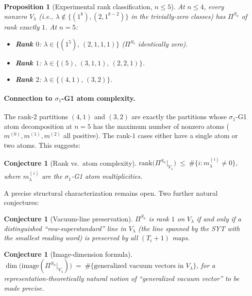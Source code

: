 \documentclass[11pt]{article}
\newtheorem{proposition}[theorem]{Proposition}
\newtheorem{conjecture}[theorem]{Conjecture}
\theoremstyle{definition}
\begin{document}
\begin{proposition}[Experimental rank classification, $n \leq 5$]\label{prop:rank-class}
At $n \leq 4$, every nonzero $V_\lambda$ (i.e., $\lambda \notin \{(1^k), (2,1^{k-2})\}$ in the trivially-zero classes) has $\Pi^{S_n}$ of rank exactly $1$. At $n = 5$:
\begin{itemize}[leftmargin=2em,topsep=0.3em,itemsep=0.2em]
\item \textbf{Rank $0$}: $\lambda \in \{(1^5),\, (2,1,1,1)\}$ ($\Pi^{S_5}$ identically zero).
\item \textbf{Rank $1$}: $\lambda \in \{(5),\, (3,1,1),\, (2,2,1)\}$.
\item \textbf{Rank $2$}: $\lambda \in \{(4,1),\, (3,2)\}$.
\end{itemize}
\end{proposition}

\paragraph{Connection to $\sigma_1$-G1 atom complexity.} The rank-$2$ partitions $(4,1)$ and $(3,2)$ are exactly the partitions whose $\sigma_1$-G1 atom decomposition at $n=5$ has the maximum number of nonzero atoms ($m^{(0)}, m^{(1)}, m^{(2)}$ all positive). The rank-$1$ cases either have a single atom or two atoms. This suggests:

\begin{conjecture}[Rank vs.\ atom complexity]\label{conj:rank-atom}
$\mathrm{rank}\bigl(\Pi^{S_n}\big|_{V_\lambda}\bigr) \;\leq\; \#\{i : m_\lambda^{(i)} \neq 0\}$,
where $m_\lambda^{(i)}$ are the $\sigma_1$-G1 atom multiplicities.
\end{conjecture}

A precise structural characterization remains open. Two further natural conjectures:

\begin{conjecture}[Vacuum-line preservation]\label{conj:vacuum}
$\Pi^{S_n}$ is rank $1$ on $V_\lambda$ if and only if a distinguished ``row-superstandard'' line in $V_\lambda$ (the line spanned by the SYT with the smallest reading word) is preserved by all $(T_i + 1)$ maps.
\end{conjecture}

\begin{conjecture}[Image-dimension formula]\label{conj:image-dim}
$\dim\bigl(\mathrm{image}(\Pi^{S_n}|_{V_\lambda})\bigr) \;=\; \#\{\text{generalized vacuum vectors in } V_\lambda\}$,
for a representation-theoretically natural notion of ``generalized vacuum vector'' to be made precise.
\end{conjecture}
\end{document}
